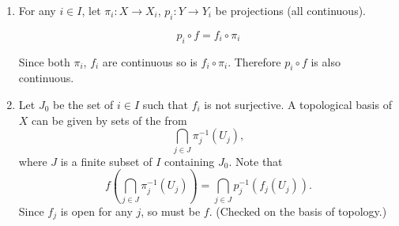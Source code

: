 \begin{proofenv}
    \quad
    \begin{enumerate}
        \item For any $i\in I$, let $\pi_i : X\rightarrow X_i$, $p_i : Y \rightarrow Y_i$ be projections (all continuous).
            \begin{center}
                $$p_i \circ f = f_i \circ \pi_i$$
            \end{center}
            Since both $\pi_i$, $f_i$ are continuous so is $f_i \circ \pi_i$.
            Therefore $p_i \circ f$ is also continuous.
        \item Let $J_0$ be the set of $i\in I$ such that $f_i$ is not surjective.
            A topological basis of $X$ can be given by sets of the from
            $$ \bigcap_{j \in J} \pi_{j}^{-1} \left(U_j\right),$$
            where $J$ is a finite subset of $I$ containing $J_0$.
            Note that
            $$ f\left(\bigcap_{j \in J} \pi^{-1}_{j} (U_j)\right) = \bigcap_{j \in J} p^{-1}_{j}\left(f_j(U_j)\right).$$
            Since $f_j$ is open for any $j$, so must be $f$.
            (Checked on the basis of topology.)
    \end{enumerate}
\end{proofenv}

